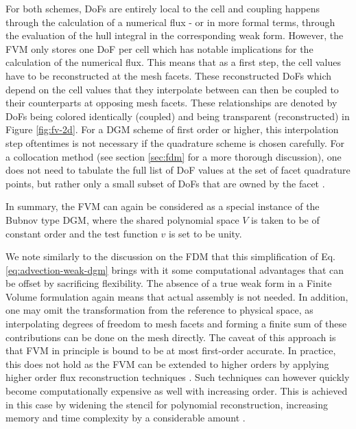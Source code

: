 \documentclass[asi,article,submit,moreauthors]{Definitions/mdpi}
\begin{document}
For both schemes, DoFs are entirely local to the cell and coupling happens through the calculation of a numerical flux - or in more formal terms, through the evaluation of the hull integral in the corresponding weak form.
However, the FVM only stores one DoF per cell which has notable implications for the calculation of the numerical flux.
This means that as a first step, the cell values have to be reconstructed at the mesh facets. These reconstructed DoFs which depend on the cell values that they interpolate between can then be coupled to their counterparts at opposing mesh facets. These relationships are denoted by DoFs being colored identically (coupled) and being transparent (reconstructed) in Figure \ref{fig:fv-2d}.
For a DGM scheme of first order or higher, this interpolation step oftentimes is not necessary if the quadrature scheme is chosen carefully.
For a collocation method (see section \ref{sec:fdm} for a more thorough discussion), one does not need to tabulate the full list of DoF values at the set of facet quadrature points, but rather only a small subset of DoFs that are owned by the facet \cite{hesthavenNodalDiscontinuousGalerkin2008}.

In summary, the FVM can again be considered as a special instance of the Bubnov type DGM, where the shared polynomial space $V$ is taken to be of constant order and the test function $v$ is set to be unity.

We note similarly to the discussion on the FDM that this simplification of Eq. \ref{eq:advection-weak-dgm} brings with it some computational advantages that can be offset by sacrificing flexibility.
The absence of a true weak form in a Finite Volume formulation again means that actual assembly is not needed.
In addition, one may omit the transformation from the reference to physical space, as interpolating degrees of freedom to mesh facets and forming a finite sum of these contributions can be done on the mesh directly.
The caveat of this approach is that FVM in principle is bound to be at most first-order accurate.
In practice, this does not hold as the FVM can be extended to higher orders by applying higher order flux reconstruction techniques \cite{zhouNumericalComparisonWENO2001,shuHighorderFiniteDifference2003}.
Such techniques can however quickly become computationally expensive as well with increasing order.
This is achieved in this case by widening the stencil for polynomial reconstruction, increasing memory and time complexity by a considerable amount \cite{liuRobustReconstructionUnstructured2013}.
\end{document}

